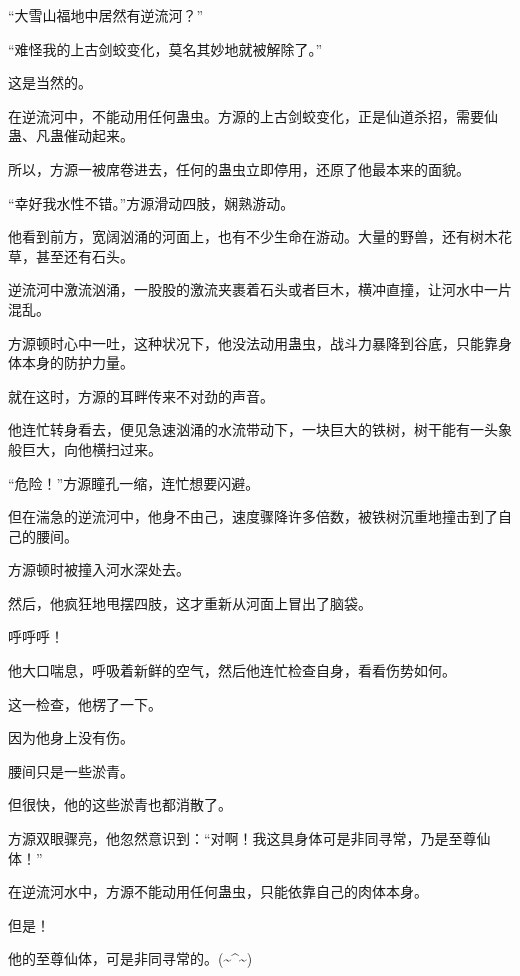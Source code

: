 \begin{this_body}
“大雪山福地中居然有逆流河？”

“难怪我的上古剑蛟变化，莫名其妙地就被解除了。”

这是当然的。

在逆流河中，不能动用任何蛊虫。方源的上古剑蛟变化，正是仙道杀招，需要仙蛊、凡蛊催动起来。

所以，方源一被席卷进去，任何的蛊虫立即停用，还原了他最本来的面貌。

“幸好我水性不错。”方源滑动四肢，娴熟游动。

他看到前方，宽阔汹涌的河面上，也有不少生命在游动。大量的野兽，还有树木花草，甚至还有石头。

逆流河中激流汹涌，一股股的激流夹裹着石头或者巨木，横冲直撞，让河水中一片混乱。

方源顿时心中一吐，这种状况下，他没法动用蛊虫，战斗力暴降到谷底，只能靠身体本身的防护力量。

就在这时，方源的耳畔传来不对劲的声音。

他连忙转身看去，便见急速汹涌的水流带动下，一块巨大的铁树，树干能有一头象般巨大，向他横扫过来。

“危险！”方源瞳孔一缩，连忙想要闪避。

但在湍急的逆流河中，他身不由己，速度骤降许多倍数，被铁树沉重地撞击到了自己的腰间。

方源顿时被撞入河水深处去。

然后，他疯狂地甩摆四肢，这才重新从河面上冒出了脑袋。

呼呼呼！

他大口喘息，呼吸着新鲜的空气，然后他连忙检查自身，看看伤势如何。

这一检查，他楞了一下。

因为他身上没有伤。

腰间只是一些淤青。

但很快，他的这些淤青也都消散了。

方源双眼骤亮，他忽然意识到：“对啊！我这具身体可是非同寻常，乃是至尊仙体！”

在逆流河水中，方源不能动用任何蛊虫，只能依靠自己的肉体本身。

但是！

他的至尊仙体，可是非同寻常的。(\~{}\^{}\~{})

\end{this_body}

